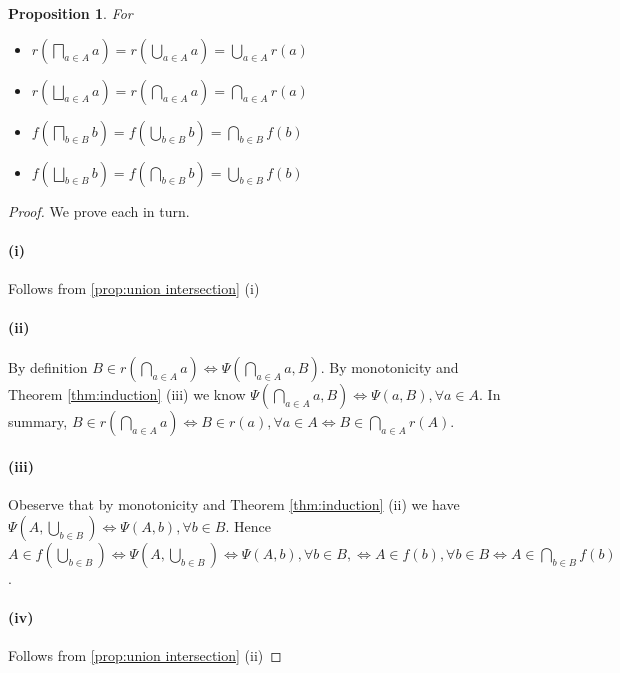 \documentclass[12pt]{article}
\theoremstyle{definition}
\theoremstyle{plain}
\theoremstyle{plain}
\newtheorem{proposition}{Proposition}[section]
\theoremstyle{plain}
\theoremstyle{plain}
\theoremstyle{remark}
\theoremstyle{remark}
\begin{document}
\begin{proposition} For 
	\begin{itemize}
		\item[(i)] $r(\bigsqcap_{a \in A} a) = r(\bigcup_{a \in A} a) = \bigcup_{a \in A}r(a)$
		\item[(ii)] $r(\bigsqcup_{a \in A} a) = r(\bigcap_{a \in A} a) = \bigcap_{a \in A}r(a)$
		\item[(iii)] $f(\bigsqcap_{b \in B} b) = f(\bigcup_{b \in B} b) = \bigcap_{b \in B}f(b)$
		\item[(iv)] $f(\bigsqcup_{b \in B} b) = f(\bigcap_{b \in B} b) = \bigcup_{b \in B}f(b)$
	\end{itemize}
\end{proposition}
\begin{proof}We prove each in turn.
	
	\paragraph{(i)} Follows from \ref{prop:union intersection} (i)
	
	\paragraph{(ii)} By definition $B \in r(\bigcap_{a \in A} a) \Leftrightarrow \Psi(\bigcap_{a \in A} a, B)$. By monotonicity and Theorem \ref{thm:induction} (iii) we know $\Psi(\bigcap_{a \in A} a, B) \Leftrightarrow \Psi(a,B), \forall a \in A$. In summary, $B \in r(\bigcap_{a \in A} a) \Leftrightarrow B \in r(a), \forall a \in A \Leftrightarrow B \in \bigcap_{a \in A}r(A)$.
	
	\paragraph{(iii)} Obeserve that by monotonicity and Theorem \ref{thm:induction} (ii) we have $\Psi(A,\bigcup_{b \in B}) \Leftrightarrow \Psi(A,b), \forall b \in B$. Hence $A \in f(\bigcup_{b \in B}) \Leftrightarrow \Psi(A,\bigcup_{b \in B}) \Leftrightarrow \Psi(A,b), \forall b \in B, \Leftrightarrow A \in f(b), \forall b \in B \Leftrightarrow A \in \bigcap_{b \in B} f(b)$.
	
	\paragraph{(iv)} Follows from \ref{prop:union intersection} (ii)
\end{proof}
\end{document}
